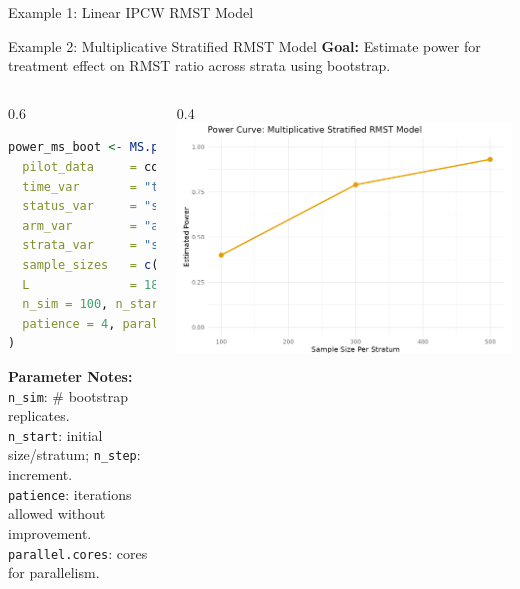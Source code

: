 \documentclass{beamer}
\begin{document}
\begin{frame}[fragile]{Example 1: Linear IPCW RMST Model}
\end{frame}

\begin{frame}[fragile]{Example 2: Multiplicative Stratified RMST Model}
\textbf{Goal:} Estimate power for treatment effect on RMST ratio across strata using bootstrap.

\begin{columns}[T,onlytextwidth]
  \begin{column}{0.6\textwidth}
  \scriptsize
\begin{lstlisting}[language=R]
power_ms_boot <- MS.power.boot(
  pilot_data     = colon_death,
  time_var       = "time",
  status_var     = "status",
  arm_var        = "arm",
  strata_var     = "strata",
  sample_sizes   = c(100, 300, 500),
  L              = 1825,
  n_sim = 100, n_start = 100, n_step = 50,
  patience = 4, parallel.cores = 10
)
\end{lstlisting}
{\scriptsize
\textbf{Parameter Notes:} \\
\texttt{n\_sim}: \# bootstrap replicates. \\
\texttt{n\_start}: initial size/stratum; \texttt{n\_step}: increment. \\
\texttt{patience}: iterations allowed without improvement. \\
\texttt{parallel.cores}: cores for parallelism. \\
}
  \end{column}
  \begin{column}{0.4\textwidth}
    \centering
    \includegraphics[width=\linewidth]{images/Example_MS.png}


\end{column}
\end{columns}
\end{frame}
\end{document}
